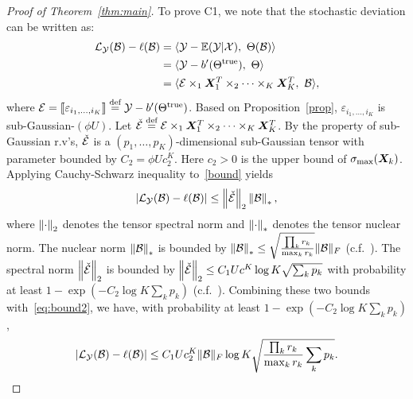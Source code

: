\documentclass[11pt]{article}
\theoremstyle{plain}
\theoremstyle{definition}
\begin{document}
\begin{proof}[Proof of Theorem~\ref{thm:main}]
To prove C1, we note that the stochastic deviation can be written as:
\begin{align}\label{bound}
\tL_{\tY}(\tB)-\ell(\tB)&=\langle \tY-\mathbb{E}(\tY|\tX),\ \Theta(\tB)\rangle\notag \\
&= \langle \tY- b'(\trueT),\ \Theta\rangle \notag \\
&= \langle \tE\times_1\mX^T_1\times_2\cdots\times_K\mX^T_K,\ \tB\rangle,
\end{align}
where $\mathcal{E}=\llbracket \varepsilon_{i_1,\ldots,i_K} \rrbracket\stackrel{\text{def}}{=}\mathcal{Y}-b'(\Theta^{\text{true}})$. Based on Proposition~\ref{prop}, $\varepsilon_{i_1,\ldots,i_K}$ is sub-Gaussian-$(\phi U)$. Let $\check{\mathcal{E}}\stackrel{\text{def}}{=}\mathcal{E}\times_1\bm X^T_1\times_2\cdots\times_K\bm X^T_K$. By the property of sub-Gaussian r.v's, $\check {\mathcal{E}}$ is a $(p_1,\ldots,p_K)$-dimensional sub-Gaussian tensor with parameter bounded by $C_2=\phi Uc^{K}_2$. Here $c_2>0$ is the upper bound of $\sigma_{\max}(\bm X_k)$. Applying Cauchy-Schwarz inequality to~\eqref{bound} yields
\begin{equation}\label{eq:bound2}
|\mathcal{L}_{\mathcal{Y}}(\mathcal{B})-\ell(\mathcal{B})|\leq \left\lVert\check {\mathcal{E}}\right\rVert_2 \left\lVert\mathcal{B}\right\rVert_*,
\end{equation}
where $\left\lVert\cdot\right\rVert_2$ denotes the tensor spectral norm and $\left\lVert\cdot\right\rVert_*$ denotes the tensor nuclear norm. The nuclear norm $\left\lVert\mathcal{B}\right\rVert_*$ is  bounded by $\left\lVert\mathcal{B}\right\rVert_*\leq \sqrt{{\prod_k r_k \over \max_k r_k}}\lVert\mathcal{B}\rVert_F$ (c.f.~\cite{wang2018learning,wang2017operator}). The spectral norm $\left\lVert\check {\mathcal{E}}\right\rVert_2$ is bounded by $\left\lVert\check {\mathcal{E}}\right\rVert_2\leq C_1 Uc^{K} \log K \sqrt{\sum_k p_k}$ with probability at least $1-\exp(-C_2\log K \sum_kp_k)$ (c.f.~\cite{wang2018learning,tomioka2014spectral}). Combining these two bounds with~\eqref{eq:bound2}, we have, with probability at least $1-\exp(-C_2\log K \sum_kp_k)$, 
\[
|\mathcal{L}_{\mathcal{Y}}(\mathcal{B})-\ell(\mathcal{B})|\leq C_1Uc_2^{K}\lVert\mathcal{B}\rVert_F \log K  \sqrt{ {\prod_k r_k\over \max_k r_k}\sum_k p_k}.
\]


\end{proof}
\end{document}
